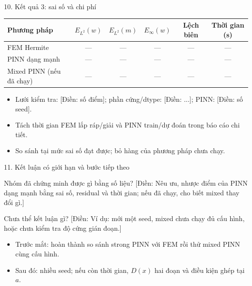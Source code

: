 \documentclass[10pt,aspectratio=169]{beamer}
\newcommand{\todo}[1]{{\color{red!70!black}[Điền: #1]}}
\begin{document}
\begin{frame}{10. Kết quả 3: sai số và chi phí}
\small
\begin{table}
\centering
\begin{tabular}{lccccc}
\toprule
Phương pháp & $E_{L^2}(w)$ & $E_{L^2}(m)$ & $E_\infty(w)$ & Lệch biên & Thời gian (s)\\
\midrule
FEM Hermite & --- & --- & --- & --- & ---\\
PINN dạng mạnh & --- & --- & --- & --- & ---\\
Mixed PINN (nếu đã chạy) & --- & --- & --- & --- & ---\\
\bottomrule
\end{tabular}
\end{table}
\begin{itemize}
\item Lưới kiểm tra: \todo{số điểm}; phần cứng/dtype: \todo{...}; PINN: \todo{số seed}.
\item Tách thời gian FEM lắp ráp/giải và PINN train/dự đoán trong báo cáo chi tiết.
\item So sánh tại mức sai số đạt được; bỏ hàng của phương pháp chưa chạy.
\end{itemize}
\end{frame}

\begin{frame}{11. Kết luận có giới hạn và bước tiếp theo}
\begin{block}{Nhóm đã chứng minh được gì bằng số liệu?}
\todo{Nêu ưu, nhược điểm của PINN dạng mạnh bằng sai số, residual và thời gian; nếu đã chạy, cho biết mixed thay đổi gì.}
\end{block}
\begin{alertblock}{Chưa thể kết luận gì?}
\todo{Ví dụ: mới một seed, mixed chưa chạy đủ cấu hình, hoặc chưa kiểm tra độ cứng gián đoạn.}
\end{alertblock}
\begin{itemize}
\item Trước mắt: hoàn thành so sánh strong PINN với FEM rồi thử mixed PINN cùng cấu hình.
\item Sau đó: nhiều seed; nếu còn thời gian, $D(x)$ hai đoạn và điều kiện ghép tại $a$.
\end{itemize}
\end{frame}
\end{document}
